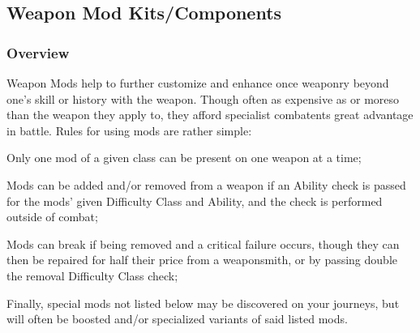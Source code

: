 \documentclass[12pt, landscape]{article}
\begin{document}
\begin{FlushLeft}
\begin{multicols}{2}
			\subsection{Weapon Mod Kits/Components}
			\subsubsection{Overview}
			Weapon Mods help to further customize and enhance once weaponry beyond one's skill or history with the weapon.
			Though often as expensive as or moreso than the weapon they apply to, they afford specialist combatents great advantage in battle. \linebreak
			Rules for using mods are rather simple: \linebreak

			Only one mod of a given class can be present on one weapon at a time; \linebreak

			Mods can be added and/or removed from a weapon if an Ability check is passed for the mods' given Difficulty Class and Ability, and the check is performed outside of combat; \linebreak

			Mods can break if being removed and a critical failure occurs, though they can then be repaired for half their price from a weaponsmith, or by passing double the removal Difficulty Class check; \linebreak

			Finally, special mods not listed below may be discovered on your journeys, but will often be boosted and/or specialized variants of said listed mods.

\end{multicols}
\end{FlushLeft}
\end{document}
